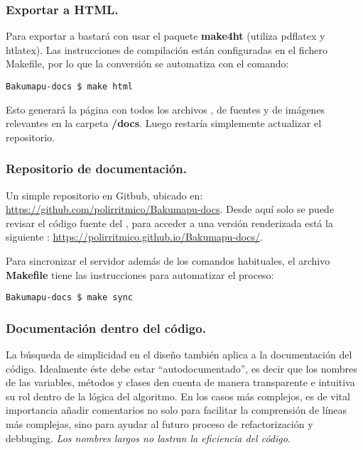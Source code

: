 \subsubsection{Exportar a HTML.}\label{flujo:exportar-a-html}
Para exportar a  bastará con usar el paquete \textbf{make4ht} (utiliza pdflatex y htlatex). Las instrucciones de compilación están configuradas en el fichero Makefile, por lo que la conversión se automatiza con el comando:
\begin{lstlisting}
Bakumapu-docs $ make html
\end{lstlisting}
Esto generará la página  con todos los archivos , de fuentes y de imágenes relevantes en la carpeta \textbf{/docs}. Luego restaría simplemente actualizar el repositorio.

\subsubsection{Repositorio de documentación.}\label{flujo:repositorio-de-documentacion}
Un simple repositorio  en Gitbub, ubicado en: \url{https://github.com/polirritmico/Bakumapu-docs}. Desde aquí solo se puede revisar el código fuente del , para acceder a una versión renderizada está la siguiente : \url{https://polirritmico.github.io/Bakumapu-docs/}.

Para sincronizar el servidor además de los comandos  habituales, el archivo \textbf{Makefile} tiene las instrucciones para automatizar el proceso:
\begin{lstlisting}
Bakumapu-docs $ make sync
\end{lstlisting}

\subsubsection{Documentación dentro del código.}\label{flujo:documentacion-en-codigo}
La búsqueda de simplicidad en el diseño también aplica a la documentación del código. Idealmente éste debe estar “autodocumentado”, es decir que los nombres de las variables, métodos y clases den cuenta de manera transparente e intuitiva su rol dentro de la lógica del algoritmo. En los casos más complejos, es de vital importancia añadir comentarios no solo para facilitar la comprensión de líneas más complejas, sino para ayudar al futuro proceso de refactorización y debbuging. \emph{Los nombres largos no lastran la eficiencia del código}.

